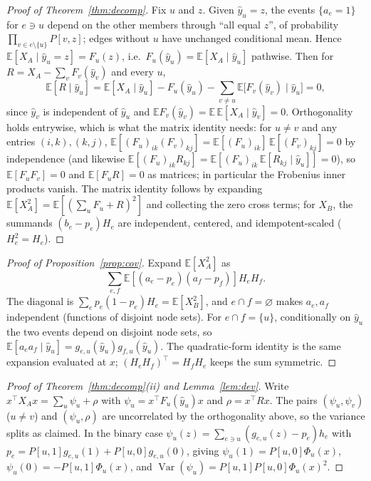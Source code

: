 \documentclass[preprint,11pt]{elsarticle}
\begin{document}
\begin{proof}[Proof of Theorem~\ref{thm:decomp}]
Fix $u$ and $z$. Given $\hat y_u=z$, the events
$\{a_e=1\}$ for $e\ni u$ depend on the other members through
``all equal $z$'', of probability $\prod_{v\in e\setminus\{u\}}P[v,z]$;
edges without $u$ have unchanged conditional mean. Hence
$\mathbb E[X_A\mid\hat y_u=z]=F_u(z)$, i.e.\ $F_u(\hat y_u)
=\mathbb E[X_A\mid\hat y_u]$ pathwise. Then for $R=X_A-\sum_vF_v(\hat y_v)$
and every $u$,
\[
\mathbb E[R\mid\hat y_u]
=\mathbb E[X_A\mid\hat y_u]-F_u(\hat y_u)
-\sum_{v\ne u}\mathbb E\bigl[F_v(\hat y_v)\mid\hat y_u\bigr]=0,
\]
since $\hat y_v$ is independent of $\hat y_u$ and
$\mathbb EF_v(\hat y_v)=\mathbb E\,\mathbb E[X_A\mid\hat y_v]=0$.
Orthogonality holds entrywise, which is what the matrix identity
needs: for $u\ne v$ and any entries $(i,k),(k,j)$,
$\mathbb E[(F_u)_{ik}(F_v)_{kj}]
=\mathbb E[(F_u)_{ik}]\,\mathbb E[(F_v)_{kj}]=0$ by independence
(and likewise $\mathbb E[(F_u)_{ik}R_{kj}]
=\mathbb E[(F_u)_{ik}\,\mathbb E[R_{kj}\mid\hat y_u]]=0$), so
$\mathbb E[F_uF_v]=0$ and $\mathbb E[F_uR]=0$ as matrices; in
particular the Frobenius inner products vanish.
The matrix identity follows by expanding
$\mathbb E[X_A^2]=\mathbb E[(\sum_uF_u+R)^2]$ and collecting the
zero cross terms; for $X_B$, the summands $(b_e-p_e)H_e$ are
independent, centered, and idempotent-scaled ($H_e^2=H_e$).
\end{proof}

\begin{proof}[Proof of Proposition~\ref{prop:cov}]
Expand $\mathbb E[X_A^2]$ as
\[
\sum_{e,f}\mathbb E[(a_e-p_e)(a_f-p_f)]H_eH_f.
\]
The diagonal is $\sum_ep_e(1-p_e)H_e=\mathbb E[X_B^2]$, and
$e\cap f=\varnothing$ makes $a_e,a_f$ independent (functions of
disjoint node sets). For $e\cap f=\{u\}$, conditionally on $\hat y_u$
the two events depend on disjoint node sets, so
$\mathbb E[a_ea_f\mid\hat y_u]=g_{e,u}(\hat y_u)g_{f,u}(\hat y_u)$.
The quadratic-form identity is the same expansion evaluated at $x$;
$(H_eH_f)^\top=H_fH_e$ keeps the sum symmetric.
\end{proof}

\begin{proof}[Proof of Theorem~\ref{thm:decomp}(ii) and
Lemma~\ref{lem:dev}]
Write $x^\top X_Ax=\sum_u\psi_u+\rho$ with
$\psi_u=x^\top F_u(\hat y_u)x$ and $\rho=x^\top Rx$. The pairs
$(\psi_u,\psi_v)$ ($u\ne v$) and $(\psi_u,\rho)$ are uncorrelated by
the orthogonality above, so the variance splits as claimed. In the
binary case $\psi_u(z)=\sum_{e\ni u}(g_{e,u}(z)-p_e)h_e$ with
$p_e=P[u,1]g_{e,u}(1)+P[u,0]g_{e,u}(0)$, giving
$\psi_u(1)=P[u,0]\Phi_u(x)$, $\psi_u(0)=-P[u,1]\Phi_u(x)$, and
$\operatorname{Var}(\psi_u)=P[u,1]P[u,0]\Phi_u(x)^2$.
\end{proof}
\end{document}

